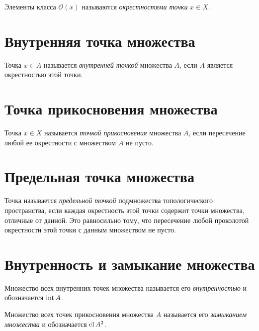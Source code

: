 \begin{definition}
	Элементы класса $\mathcal{O}(x)$ называются \emph{окрестностями точки} $x \in X$.
\end{definition}

\section{Внутренняя точка множества}

\begin{definition}
	Точка $x \in A$ называется \emph{внутренней точкой} множества $A$, если $A$ является окрестностью этой точки.
\end{definition}

\section{Точка прикосновения множества}

\begin{definition}
	Точка $x \in X$ называется \emph{точкой прикосновения} множества $A$, если пересечение любой ее окрестности с множеством $A$ не пусто.
\end{definition}

\section{Предельная точка множества}

\begin{definition}
	Точка называется \emph{предельной точкой} подмножества топологического пространства, если каждая окрестность этой точки содержит точки множества, отличные от данной. Это равносильно тому, что пересечение любой проколотой окрестности этой точки с данным множеством не пусто.
\end{definition}

\section{Внутренность и замыкание множества}

\begin{definition}
	Множество всех внутренних точек множества называется его \emph{внутренностью} и обозначается $\operatorname{int} A$.
\end{definition}

\begin{definition}
	Множество всех точек прикосновения множества $A$ называется его \emph{замыканием множества} и обозначается $\operatorname{cl} A^2$.
\end{definition}

